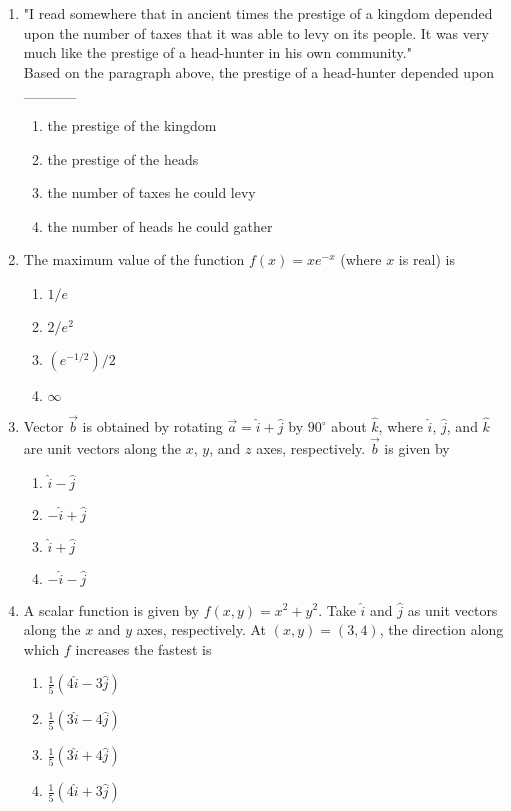 \documentclass[article]{IEEEtran}
\numberwithin{figure}{enumi}
\begin{document}
\begin{enumerate}
    \item "I read somewhere that in ancient times the prestige of a kingdom depended upon the number of taxes that it was able to levy on its people. It was very much like the prestige of a head-hunter in his own community." \\
    Based on the paragraph above, the prestige of a head-hunter depended upon \_\_\_\_\_
    \begin{enumerate}
        \item the prestige of the kingdom
        \item the prestige of the heads
        \item the number of taxes he could levy
        \item the number of heads he could gather
    \end{enumerate}

\item The maximum value of the function $f(x) = xe^{-x}$ (where $x$ is real) is
    \begin{enumerate}
        \item $1/e$
        \item $2/e^2$
        \item $(e^{-1/2})/2$
        \item $\infty$
    \end{enumerate}
    
    \item Vector $\vec{b}$ is obtained by rotating $\vec{a} = \hat{i} + \hat{j}$ by $90^\circ$ about $\hat{k}$, where $\hat{i}$, $\hat{j}$, and $\hat{k}$ are unit vectors along the $x$, $y$, and $z$ axes, respectively. $\vec{b}$ is given by
    \begin{enumerate}
        \item $\hat{i} - \hat{j}$
        \item $-\hat{i} + \hat{j}$
        \item $\hat{i} + \hat{j}$
        \item $-\hat{i} - \hat{j}$
    \end{enumerate}
    
    \item A scalar function is given by $f(x, y) = x^2 + y^2$. Take $\hat{i}$ and $\hat{j}$ as unit vectors along the $x$ and $y$ axes, respectively. At $(x, y) = (3, 4)$, the direction along which $f$ increases the fastest is
    \begin{enumerate}
        \item $\frac{1}{5}(4\hat{i} - 3\hat{j})$
        \item $\frac{1}{5}(3\hat{i} - 4\hat{j})$
        \item $\frac{1}{5}(3\hat{i} + 4\hat{j})$
        \item $\frac{1}{5}(4\hat{i} + 3\hat{j})$
    \end{enumerate}
\end{enumerate}
\end{document}
